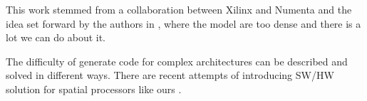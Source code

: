 \documentclass[sigconf]{acmart}
\begin{document}
This work stemmed from a collaboration between Xilinx and Numenta and
the idea set forward by the authors in \cite{ahmad2019dense}, where
the model are too dense and there is a lot we can do about
it. 


The difficulty of generate code for complex architectures can be
described and solved in different ways. There are recent attempts of
introducing SW/HW solution for spatial processors like ours
\cite{Huang2021CoSASB,Russo2023MemoryAwareDA,Cai2023InterlayerSS}. 




\begin{comment}
In Table \ref{tab_perf}, we present the estimates of the total
execution time for three networks and seven configurations. We report
also the case where the compiler fails to generate code.  Here, we
present the collection of execution times as images:
\begin{itemize}
  \item Figure \ref{fig:incv3-1} Inception V3 2x2 dense and sparse
  \item Figure \ref{fig:incv3-2} Inception V3 3x3 dense and sparse
  \item Figure \ref{fig:incv3-3} Inception V3 4x4 dense and sparse
  \item Figure \ref{fig:incv3-4} Inception V3 5x5 dense and sparse FAILs
  \item Figure \ref{fig:incv3-5} Inception V3 6x6 dense and sparse 
  \item Figure \ref{fig:incv3-6} Inception V3 8x8 dense and sparse
  \item Figure \ref{fig:incv3-7} Resnet 50 2x2 dense and sparse   
  \item Figure \ref{fig:incv3-8} Resnet 50 3x3 dense and sparse   
  \item Figure \ref{fig:incv3-9} Resnet 50 4x4 dense and sparse   
  \item Figure \ref{fig:incv3-10} Resnet 50 5x5 dense FAILs and sparse   
  \item Figure \ref{fig:incv3-11} Resnet 50 6x6 dense and sparse   
  \item Figure \ref{fig:incv3-12} VGG16  2x2 dense and sparse   
  \item Figure \ref{fig:incv3-13} VGG16  4x4 dense and sparse   
  \item Figure \ref{fig:incv3-14} VGG16  8x8 dense and sparse   
\end{itemize}
\newpage 
\DDoublefigure{1.3}{IncV3-2x2-2share-dense.png}{IncV3-2x2-2share-sparse.png}{Inception

\end{comment}
\end{document}
